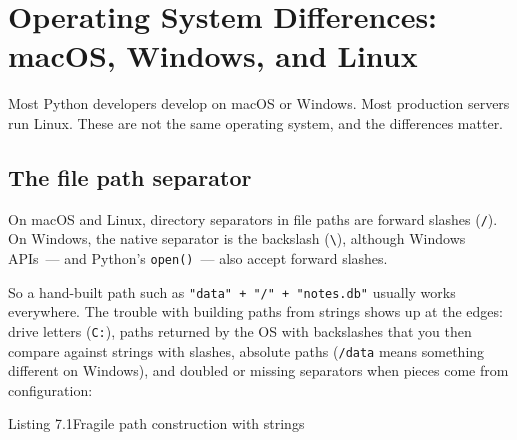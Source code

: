 \setcounter{section}{1}
\section{Operating System Differences: macOS, Windows, and Linux}\label{07-environment-drift:72-operating-system-differences-macos-windows-and-linux}

Most Python developers develop on macOS or Windows. Most production servers run Linux. These are not the same operating system, and the differences matter.

\subsection*{The file path separator}\label{07-environment-drift:the-file-path-separator}

On macOS and Linux, directory separators in file paths are forward slashes (\texttt{/}). On Windows, the native separator is the backslash (\texttt{\textbackslash{}}), although Windows APIs~--- and Python's \texttt{open()}~--- also accept forward slashes.

So a hand-built path such as \texttt{"data"\ +\ "/}\allowbreak{}\texttt{"\ +\ "notes.}\allowbreak{}\texttt{db"} usually works everywhere. The trouble with building paths from strings shows up at the edges: drive letters (\texttt{C:}), paths returned by the OS with backslashes that you then compare against strings with slashes, absolute paths (\texttt{/data} means something different on Windows), and doubled or missing separators when pieces come from configuration:

\begin{codeboxcap}[short]{\textcolor{accent}{Listing 7.1}\enspace Fragile path construction with strings}

\begin{Shaded}
\begin{Highlighting}[]
\OperatorTok{=}\NormalTok{, }\NormalTok{)      }
\OperatorTok{=}\OperatorTok{+}  \OperatorTok{+}             
\OperatorTok{==}
\end{Highlighting}
\end{Shaded}

\end{codeboxcap}

